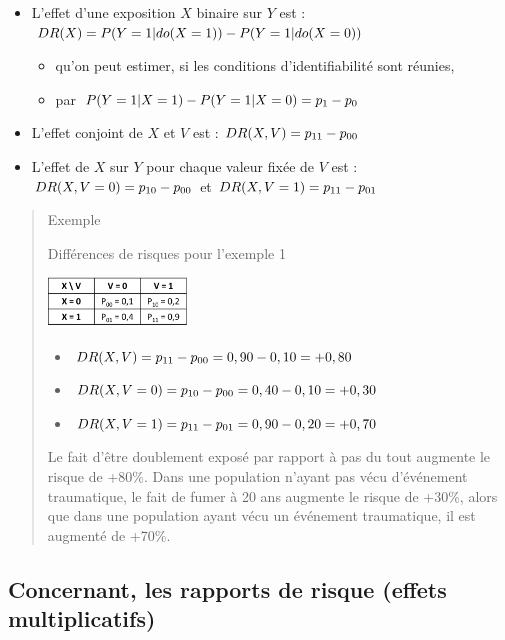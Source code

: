\documentclass[
]{book}
\providecommand{\tightlist}{%
  \setlength{\itemsep}{0pt}\setlength{\parskip}{0pt}}
\begin{document}
\begin{itemize}
\tightlist
\item
  L'effet d'une exposition \(X\) binaire sur \(Y\) est : \(\small DR(X) = P(Y = 1|do(X = 1)) - P(Y = 1|do(X = 0))\)

  \begin{itemize}
  \tightlist
  \item
    qu'on peut estimer, si les conditions d'identifiabilité sont réunies,
  \item
    par \(\small P(Y = 1|X = 1) - P(Y = 1|X = 0) = p_1-p_0\)
  \end{itemize}
\item
  L'effet conjoint de \(X\) et \(V\) est : \(\small DR(X,V) = p_{11}-p_{00}\)
\item
  L'effet de \(X\) sur \(Y\) pour chaque valeur fixée de \(V\) est : \(\small DR(X,V=0) = p_{10}-p_{00}\) et \(\small DR(X,V=1) = p_{11}-p_{01}\)
\end{itemize}

\begin{quote}
Exemple

Différences de risques pour l'exemple 1

\includegraphics[width=0.3\textwidth,height=\textheight]{img/Image1.png}

\begin{itemize}
\tightlist
\item
  \(\small DR(X,V) = p_{11}-p_{00} = 0,90 - 0,10 = +0,80\)
\item
  \(\small DR (X,V=0) = p_{10}-p_{00} = 0,40 - 0,10 = +0,30\)
\item
  \(\small DR (X,V=1) = p_{11}-p_{01} = 0,90 - 0,20 = +0,70\)
\end{itemize}

Le fait d'être doublement exposé par rapport à pas du tout augmente le risque de +80\%. Dans une population n'ayant pas vécu d'événement traumatique, le fait de fumer à 20 ans augmente le risque de +30\%, alors que dans une population ayant vécu un événement traumatique, il est augmenté de +70\%.
\end{quote}

\hypertarget{concernant-les-rapports-de-risque-effets-multiplicatifs}{%
\subsection*{Concernant, les rapports de risque (effets multiplicatifs)}\label{concernant-les-rapports-de-risque-effets-multiplicatifs}}
\end{document}
